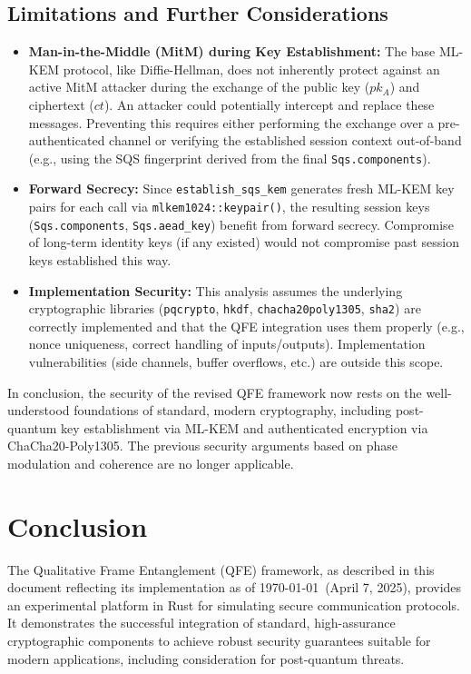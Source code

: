 \documentclass[11pt]{article}
\begin{document}
	\subsection{Limitations and Further Considerations}
	\begin{itemize}
		\item \textbf{Man-in-the-Middle (MitM) during Key Establishment:} The base ML-KEM protocol, like Diffie-Hellman, does not inherently protect against an active MitM attacker during the exchange of the public key ($pk_A$) and ciphertext ($ct$). An attacker could potentially intercept and replace these messages. Preventing this requires either performing the exchange over a pre-authenticated channel or verifying the established session context out-of-band (e.g., using the SQS fingerprint derived from the final \texttt{Sqs.components}).
		\item \textbf{Forward Secrecy:} Since \texttt{establish\_sqs\_kem} generates fresh ML-KEM key pairs for each call via \texttt{mlkem1024::keypair()}, the resulting session keys (\texttt{Sqs.components}, \texttt{Sqs.aead\_key}) benefit from forward secrecy. Compromise of long-term identity keys (if any existed) would not compromise past session keys established this way.
		\item \textbf{Implementation Security:} This analysis assumes the underlying cryptographic libraries (\texttt{pqcrypto}, \texttt{hkdf}, \texttt{chacha20poly1305}, \texttt{sha2}) are correctly implemented and that the QFE integration uses them properly (e.g., nonce uniqueness, correct handling of inputs/outputs). Implementation vulnerabilities (side channels, buffer overflows, etc.) are outside this scope.
	\end{itemize}
	
	In conclusion, the security of the revised QFE framework now rests on the well-understood foundations of standard, modern cryptography, including post-quantum key establishment via ML-KEM and authenticated encryption via ChaCha20-Poly1305. The previous security arguments based on phase modulation and coherence are no longer applicable.
	
	\section{Conclusion}
	
	The Qualitative Frame Entanglement (QFE) framework, as described in this document reflecting its implementation as of \today~(April 7, 2025), provides an experimental platform in Rust for simulating secure communication protocols. It demonstrates the successful integration of standard, high-assurance cryptographic components to achieve robust security guarantees suitable for modern applications, including consideration for post-quantum threats.
	
\end{document}
